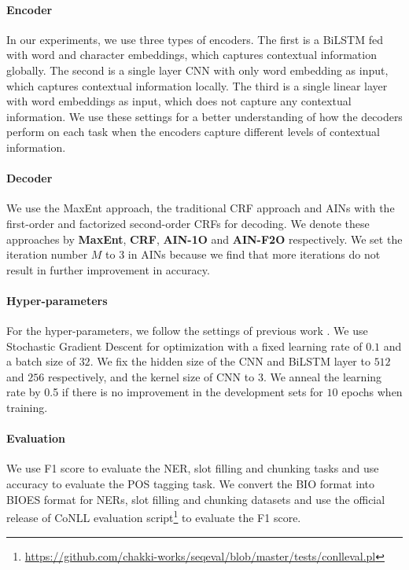 \documentclass[11pt,a4paper]{article}
\begin{document}
\paragraph{Encoder}
In our experiments, we use three types of encoders. The first is a BiLSTM fed with word and character embeddings, which captures contextual information globally.
The second is a single layer CNN with only word embedding as input, which captures contextual information locally. The third is a single linear layer with word embeddings as input, which does not capture any contextual information. We use these settings for a better understanding of how the decoders perform on each task when the encoders capture different levels of contextual information. 
\paragraph{Decoder}
We use the MaxEnt approach, the traditional CRF approach and AINs with the first-order and factorized second-order CRFs for decoding. We denote these approaches by \textbf{MaxEnt}, \textbf{CRF}, \textbf{AIN-1O} and \textbf{AIN-F2O} respectively. We set the iteration number $M$ to $3$ in AINs because we find that more iterations do not result in further improvement in accuracy. 

\paragraph{Hyper-parameters} For the hyper-parameters, we follow the settings of previous work \cite{akbik-etal-2018-contextual}. We use Stochastic Gradient Descent for optimization with a fixed learning rate of $0.1$ and a batch size of $32$. We fix the hidden size of the CNN and BiLSTM layer to $512$ and $256$ respectively, and the kernel size of CNN to $3$. We anneal the learning rate by 0.5 if there is no improvement in the development sets for $10$ epochs when training. 

\paragraph{Evaluation} We use F1 score to evaluate the NER, slot filling and chunking tasks and use accuracy to evaluate the POS tagging task. We convert the BIO format into BIOES format for NERs, slot filling and chunking datasets and use the official release of CoNLL evaluation script\footnote{\url{https://github.com/chakki-works/seqeval/blob/master/tests/conlleval.pl}} to evaluate the F1 score.
\end{document}
